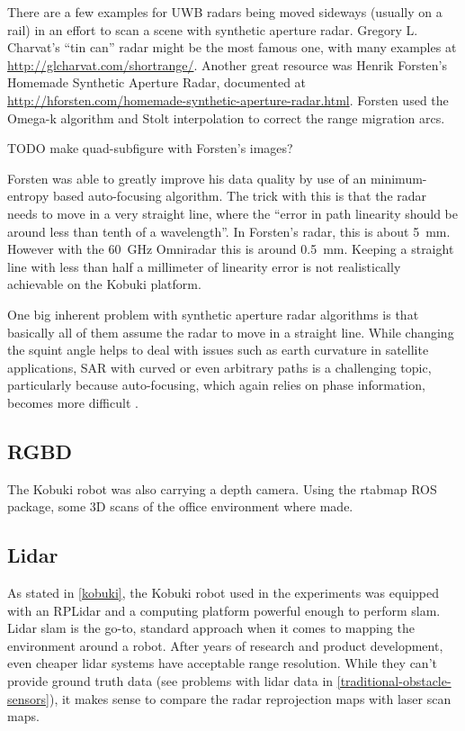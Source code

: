 There are a few examples for UWB radars being moved sideways (usually on
a rail) in an effort to scan a scene with synthetic aperture radar.
Gregory L. Charvat's ``tin can'' radar \cite{Charvat2014} might be the
most famous one, with many examples at \url{http://glcharvat.com/shortrange/}.
Another great resource was Henrik Forsten's Homemade Synthetic Aperture
Radar, documented at \url{http://hforsten.com/homemade-synthetic-aperture-radar.html}. Forsten used
the Omega-k algorithm \cite{Tolman2008} and Stolt interpolation \cite{Cumming2004} to correct the range migration arcs.

TODO make quad-subfigure with Forsten's images?

Forsten was able to greatly
improve his data quality by use of an minimum-entropy based
auto-focusing algorithm. The trick with this is that the radar needs to
move in a very straight line, where the ``error in path linearity should
be around less than tenth of a wavelength''. In Forsten's radar, this is
about \SI{5}{mm}. However with the \SI{60}{GHz} Omniradar this is around \SI{0.5}{mm}.
Keeping a straight line with less than half a millimeter of linearity
error is not realistically achievable on the Kobuki platform.



One big inherent problem with synthetic aperture radar algorithms is
that basically all of them assume the radar to move in a straight line.
While changing the squint angle helps to deal with issues such as earth
curvature in satellite applications, SAR with curved or even arbitrary
paths is a challenging topic, particularly because auto-focusing, which
again relies on phase information, becomes more difficult
\cite{Axelsson2002}.

\subsection{RGBD}\label{rgbd-1}

The Kobuki robot was also carrying a depth camera. Using the rtabmap ROS
package, some 3D scans of the office environment where made.

\subsection{Lidar}\label{lidar-1}

As stated in \cref{kobuki}, the Kobuki robot used in the experiments was
equipped with an RPLidar and a computing platform powerful enough to
perform slam. Lidar slam is the go-to, standard approach when it comes
to mapping the environment around a robot. After years of research and
product development, even cheaper lidar systems have acceptable range
resolution. While they can't provide ground truth data (see problems
with lidar data in \cref{traditional-obstacle-sensors}), it makes sense to compare the radar
reprojection maps with laser scan maps.
